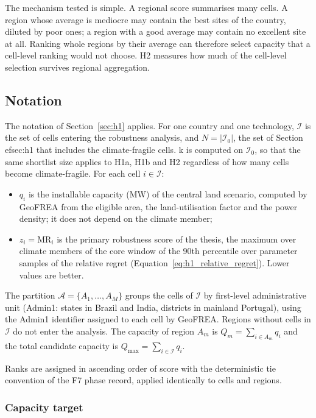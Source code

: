 The mechanism tested is simple. A regional score summarises many cells. A
region whose average is mediocre may contain the best sites of the country,
diluted by poor ones; a region with a good average may contain no excellent
site at all. Ranking whole regions by their average can therefore select
capacity that a cell-level ranking would not choose. H2 measures how much of
the cell-level selection survives regional aggregation.

\subsection{Notation}
\label{subsec:h2_notation}

The notation of Section~\ref{sec:h1} applies. For one country and one
technology, $\mathcal{I}$ is the set of cells entering the robustness analysis,
and $N=|\mathcal{I}_0|$, the set of Section~
ef{sec:h1} that includes the
climate-fragile cells. k is computed on $\mathcal{I}_0$, so that the same shortlist size applies to H1a, H1b and H2 regardless of how many cells become climate-fragile. For each cell $i\in\mathcal{I}$:
\begin{itemize}
    \item $q_i$ is the installable capacity (MW) of the central land scenario,
    computed by GeoFREA from the eligible area, the land-utilisation factor and
    the power density; it does not depend on the climate member;
    \item $z_i=\mathrm{MR}_i$ is the primary robustness score of the thesis,
    the maximum over climate members of the core window of the 90th percentile
    over parameter samples of the relative regret
    (Equation~\ref{eq:h1_relative_regret}). Lower values are better.
\end{itemize}
The partition $\mathcal{A}=\{A_1,\dots,A_M\}$ groups the cells of
$\mathcal{I}$ by first-level administrative unit (Admin1: states in Brazil and
India, districts in mainland Portugal), using the Admin1 identifier assigned to
each cell by GeoFREA. Regions without cells in $\mathcal{I}$ do not enter the
analysis. The capacity of region $A_m$ is $Q_m=\sum_{i\in A_m}q_i$ and the total
candidate capacity is $Q_{\max}=\sum_{i\in\mathcal{I}}q_i$.

Ranks are assigned in ascending order of score with the deterministic tie
convention of the F7 phase record, applied identically to cells and regions.

\subsubsection{Capacity target}

